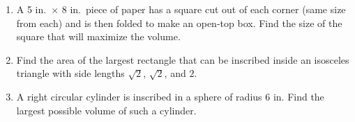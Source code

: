 \begin{enumerate}
    \item A 5 in.\ $\times$ 8 in.\ piece of paper has a square cut out of each corner (same size from each) and is then folded to make an open-top box. Find the size of the square that will maximize the volume.


    \item Find the area of the largest rectangle that can be inscribed inside an isosceles triangle with side lengths $\sqrt{2}$, $\sqrt{2}$, and $2$.

    \item A right circular cylinder is inscribed in a sphere of radius 6 in. Find the largest possible volume of such a cylinder.
  \end{enumerate}
